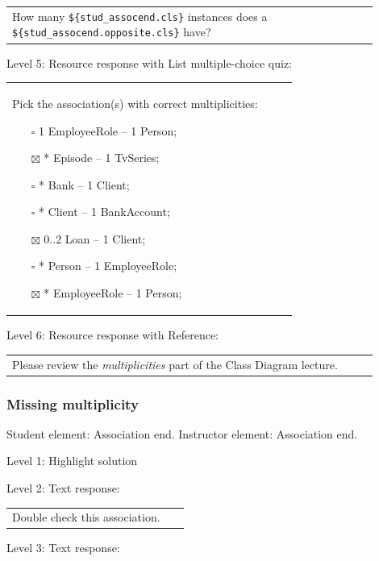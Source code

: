 \begin{tabular}{|p{0.9\linewidth}}
How many \verb|${stud_assocend.cls}| instances does a \verb|${stud_assocend.opposite.cls}| have?
\end{tabular} \medskip

\noindent Level 5: Resource response with List multiple-choice quiz: \medskip

\begin{tabular}{|p{0.9\linewidth}}

Pick the association(s) with correct multiplicities:

\begin{itemize}
    \item[$\square$] 1 EmployeeRole -- 1 Person;
    \item[$\boxtimes$] * Episode -- 1 TvSeries;
    \item[$\square$] * Bank -- 1 Client;
    \item[$\square$] * Client -- 1 BankAccount;
    \item[$\boxtimes$] 0..2 Loan -- 1 Client;
    \item[$\square$] * Person -- 1 EmployeeRole;
    \item[$\boxtimes$] * EmployeeRole -- 1 Person;
\end{itemize}

\end{tabular} \medskip

\noindent Level 6: Resource response with Reference: \medskip

\begin{tabular}{|p{0.9\linewidth}}
Please review the \textit{multiplicities} part of the Class Diagram lecture.
\end{tabular} \medskip


\subsubsection{Missing multiplicity}

Student element: Association end. Instructor element: Association end. \medskip

\noindent Level 1: Highlight solution  \medskip

\noindent Level 2: Text response: \medskip

\begin{tabular}{|p{0.9\linewidth}}
Double check this association.
\end{tabular} \medskip

\noindent Level 3: Text response: \medskip

